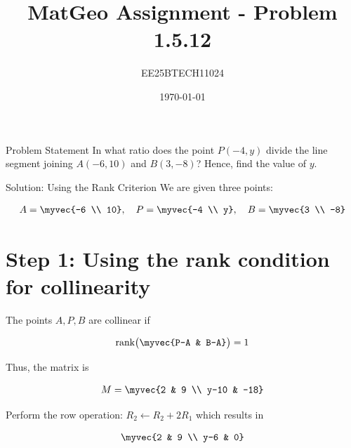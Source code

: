 \documentclass{beamer}
\title{MatGeo Assignment - Problem 1.5.12}
\author{EE25BTECH11024}
\institute{IIT Hyderabad}
\date{\today}
\begin{document}
\begin{frame}
  \titlepage
\end{frame}

\begin{frame}{Problem Statement}
In what ratio does the point $P(-4, y)$ divide the line segment joining 
$A(-6,10)$ and $B(3,-8)$? Hence, find the value of $y$.
\end{frame}

\begin{frame}{Solution: Using the Rank Criterion}
\noindent
We are given three points:

\begin{align}
A = \myvec{-6 \\ 10}, \quad 
P = \myvec{-4 \\ y}, \quad 
B = \myvec{3 \\ -8}
\end{align}

\section*{Step 1: Using the rank condition for collinearity}

The points \(A, P, B\) are collinear if

\begin{align}
\text{rank}\big(\myvec{P-A & B-A}\big) = 1
\end{align}

Thus, the matrix is

\begin{align}
M = \myvec{2 & 9 \\ y-10 & -18}
\end{align}

Perform the row operation: $R_2 \leftarrow R_2 + 2R_1$  which results in

\begin{align}
\myvec{2 & 9 \\ y-6 & 0}
\end{align}


\end{frame}
\end{document}
